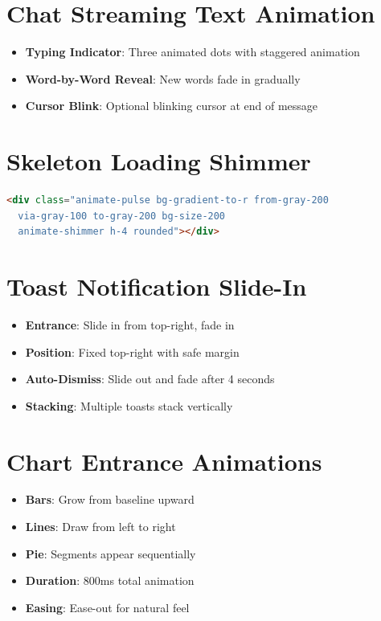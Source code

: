 \documentclass{report}
\begin{document}
\section{Chat Streaming Text Animation}

\begin{itemize}
    \item \textbf{Typing Indicator}: Three animated dots with staggered animation
    \item \textbf{Word-by-Word Reveal}: New words fade in gradually
    \item \textbf{Cursor Blink}: Optional blinking cursor at end of message
\end{itemize}

\section{Skeleton Loading Shimmer}

\begin{lstlisting}[language=HTML]
<div class="animate-pulse bg-gradient-to-r from-gray-200 
  via-gray-100 to-gray-200 bg-size-200 
  animate-shimmer h-4 rounded"></div>
\end{lstlisting}

\section{Toast Notification Slide-In}

\begin{itemize}
    \item \textbf{Entrance}: Slide in from top-right, fade in
    \item \textbf{Position}: Fixed top-right with safe margin
    \item \textbf{Auto-Dismiss}: Slide out and fade after 4 seconds
    \item \textbf{Stacking}: Multiple toasts stack vertically
\end{itemize}

\section{Chart Entrance Animations}

\begin{itemize}
    \item \textbf{Bars}: Grow from baseline upward
    \item \textbf{Lines}: Draw from left to right
    \item \textbf{Pie}: Segments appear sequentially
    \item \textbf{Duration}: 800ms total animation
    \item \textbf{Easing}: Ease-out for natural feel
\end{itemize}
\end{document}
